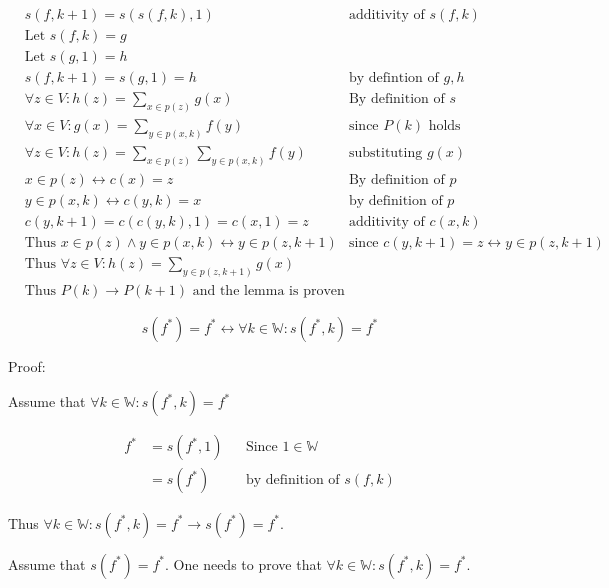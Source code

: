 \documentclass[11pt]{article}
\begin{document}
\begin{align*}
& \text{$s(f,k+1) = s(s(f,k),1)$} & \text{additivity of $s(f,k)$} \\
& \text{Let $s(f,k) = g$} & \text{} \\
& \text{Let $s(g,1) = h$} & \text{} \\
& \text{$s(f,k+1) = s(g,1) = h$} & \text{by defintion of $g,h$} \\
& \text{$\forall z \in V: h(z) = \sum_{x \in p(z)} g(x)$} & \text{By definition of $s$} \\
& \text{$\forall x \in V: g(x) = \sum_{y \in p(x,k)} f(y)$} & \text{since $P(k)$ holds} \\
& \text{$\forall z \in V: h(z) = \sum_{x \in p(z)} \sum_{y \in p(x,k)} f(y)$} & \text{substituting $g(x)$} \\
& \text{$x \in p(z) \leftrightarrow c(x)=z$} & \text{By definition of $p$} \\
& \text{$y \in p(x,k) \leftrightarrow c(y,k)=x$} & \text{by definition of $p$} \\
& \text{$c(y,k+1) = c(c(y,k),1) = c(x,1) = z$} & \text{additivity of $c(x,k)$} \\
& \text{Thus $x \in p(z) \land y \in p(x,k) \leftrightarrow y \in p(z,k+1)$} & \text{since $c(y,k+1)=z \leftrightarrow y \in p(z,k+1)$} \\
& \text{Thus $\forall z \in V: h(z) = \sum_{y \in p(z,k+1)} g(x)$} & \text{} \\
& \text{Thus $P(k) \rightarrow P(k+1)$ and the lemma is proven} & \text{}
\end{align*}

\begin{equation}
    s(f^{*}) = f^{*} \leftrightarrow \forall k \in\mathbb{W}: s(f^{*},k) = f^{*}
\end{equation}

Proof:

Assume that $\forall k \in \mathbb{W}: s(f^{*},k) = f^{*}$

\begin{align*}
    \text{$f^{*}$} &= \text{$s(f^{*},1)$} && \text{Since $1\in \mathbb{W}$} \\
    &= \text{$s(f^{*})$} && \text{by definition of $s(f,k)$}
\end{align*}

Thus $\forall k \in \mathbb{W}: s(f^{*},k) = f^{*} \rightarrow s(f^{*}) = f^{*}$.


Assume that $s(f^{*})=f^{*}$. One needs to prove that $\forall k \in \mathbb{W}: s(f^{*},k) = f^{*}$.
\end{document}
